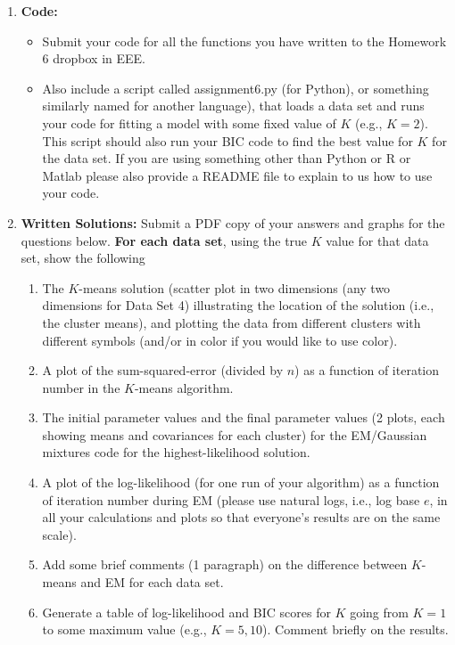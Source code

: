 \documentclass[11pt]{article}
\begin{document}
\begin{enumerate}
 
 
\item {\bf Code:}
\begin{itemize} 
\item Submit your code for all the functions you have written  to the
Homework 6 dropbox in EEE. 
\item Also include a script called assignment6.py (for Python), or something similarly named for another language), that loads a data set and runs your code for fitting a model with some fixed value of $K$ (e.g., $K=2$). This script should also run your BIC code to find the best value for $K$
for the data set.   If you are using something other than Python or R or Matlab please also provide a README file to explain to us how to use your code.
\end{itemize}

\item {\bf Written Solutions:} Submit a PDF copy of your answers and graphs for   the questions below.
{\bf For each data set}, using the
true $K$ value for that data set, show the following
\begin{enumerate}
\item The $K$-means solution (scatter plot in
 two dimensions (any two dimensions for Data Set 4)
 illustrating the location of the solution (i.e.,
 the cluster means), and plotting the data from different
 clusters with different symbols (and/or in color if you would like to use color).
\item A plot of the sum-squared-error (divided by $n$) as a function of
iteration number in the $K$-means algorithm. 
\item The initial parameter values
and the final parameter values (2 plots, each showing means and covariances for
each cluster) for the EM/Gaussian mixtures code  for the
highest-likelihood solution.  

\item A plot of the log-likelihood (for one run of your algorithm) as a
function of iteration number during EM (please use natural logs, i.e., log base $e$, in all your calculations and plots so that everyone's results are on the same scale).

\item Add some brief comments (1
paragraph) on the difference between $K$-means and EM for each data set. 
\item  Generate a table of log-likelihood and BIC scores for
$K$ going from $K=1$ to some maximum value (e.g., $K=5, 10$). Comment briefly on the results.  


\end{enumerate}
\end{enumerate}
\end{document}
